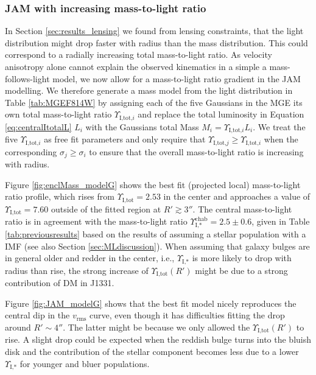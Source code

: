 \documentclass[useAMS,usenatbib]{mnras}
\begin{document}
\subsubsection{JAM with increasing mass-to-light ratio} \label{sec:results_JAM_SB_gradient}

In Section \ref{sec:results_lensing} we found from lensing constraints, that the light distribution might drop faster with radius than the mass distribution. This could correspond to a radially increasing total mass-to-light ratio. As velocity anisotropy alone cannot explain the observed kinematics in a simple a mass-follows-light model, we now allow for a mass-to-light ratio gradient in the JAM modelling. We therefore generate a mass model from the light distribution in Table \ref{tab:MGEF814W} by assigning each of the five Gaussians in the MGE its own total mass-to-light ratio $\Upsilon_{\text{I,tot,}i}$ and replace the total luminosity in Equation \eqref{eq:centralItotalL} $L_i$ with the Gaussians total Mass $M_i = \Upsilon_{\text{I,tot,}i} L_i$. We treat the five $\Upsilon_{\text{I,tot,}i}$ as free fit parameters and only require that $\Upsilon_{\text{I,tot,}j} \geq \Upsilon_{\text{I,tot,}i}$ when the corresponding $\sigma_j \geq \sigma_i$ to ensure that the overall mass-to-light ratio is increasing with radius.

Figure \ref{fig:enclMass_modelG} shows the best fit (projected local) mass-to-light ratio profile, which rises from $\Upsilon_\text{I,tot} = 2.53$ in the center and approaches a value of $\Upsilon_\text{I,tot} = 7.60$ outside of the fitted region at $R'\gtrsim 3''$. The central mass-to-light ratio is in agreement with the mass-to-light ratio $\Upsilon_\text{I,*}^\text{chab} = 2.5 \pm 0.6$, given in Table \ref{tab:previousresults} based on the results of \citet{SWELLSI} assuming a stellar population with a \citet{Chabrier2003} IMF (see also Section \ref{sec:MLdiscussion}). When assuming that galaxy bulges are in general older and redder in the center, i.e., $\Upsilon_\text{I,*}$ is more likely to drop with radius than rise, the strong increase of $\Upsilon_\text{I,tot}(R')$ might be due to a strong contribution of DM in J1331.

Figure \ref{fig:JAM_modelG} shows that the best fit model nicely reproduces the central dip in the $v_\text{rms}$ curve, even though it has difficulties fitting the drop around $R' \sim 4''$. The latter might be because we only allowed the $\Upsilon_\text{I,tot}(R')$ to rise. A slight drop could be expected when the reddish bulge turns into the bluish disk and the contribution of the stellar component becomes less due to a lower $\Upsilon_\text{I,*}$ for younger and bluer populations.
\end{document}
